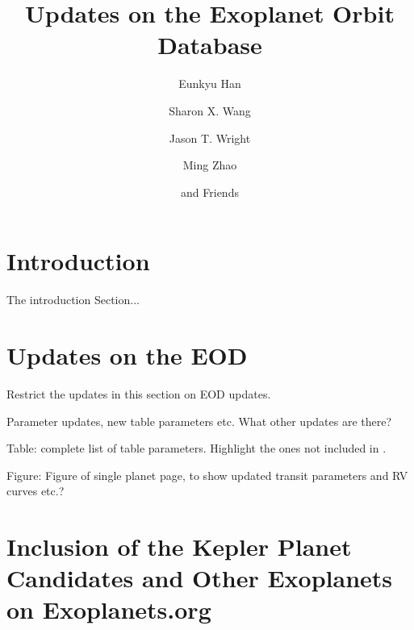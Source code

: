 \documentclass[11pt,preprint]{aastex}
\begin{document}
\begin{CJK*}{UTF8}{gbsn}

\title{Updates on the Exoplanet Orbit Database}

\author{Eunkyu Han}
\author{Sharon X. Wang}
\author{Jason T. Wright}
\author{Ming Zhao}
\author{and Friends}



\begin{abstract}

\end{abstract}  

\section{Introduction}\label{sec:intro}

The introduction Section...


\section{Updates on the EOD}\label{sec:update}

Restrict the updates in this section on EOD updates.

Parameter updates, new table parameters etc. What other updates are there?

Table: complete list of table parameters. Highlight the ones not
included in \cite{Wright2011}.

Figure: Figure of single planet page, to show updated transit
parameters and RV curves etc.?

\section{Inclusion of the Kepler Planet Candidates and Other Exoplanets on Exoplanets.org}\label{sec:kepler}


\end{CJK*}
\end{document}
